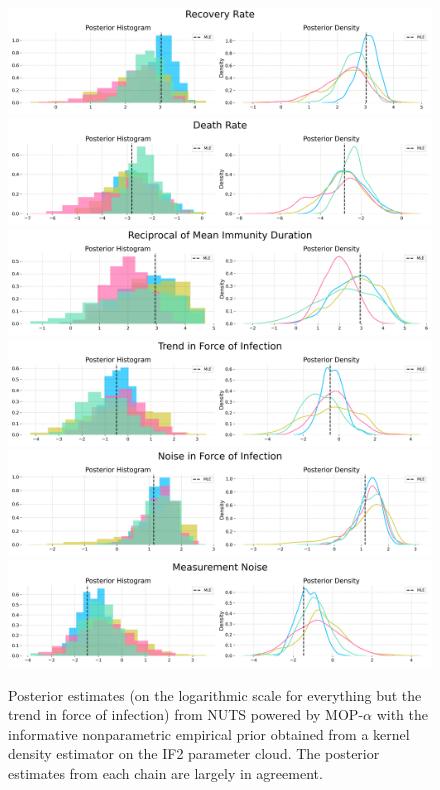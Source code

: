 \begin{figure}[H]
    \centering
    \includegraphics[scale=0.33]{imgs/pmcmc/nuts_eb/Recovery_Rate.png}
    \includegraphics[scale=0.33]{imgs/pmcmc/nuts_eb/Death_Rate.png}
    \includegraphics[scale=0.33]{imgs/pmcmc/nuts_eb/Reciprocal_of_Mean_Immunity_Duration.png}
    \includegraphics[scale=0.33]{imgs/pmcmc/nuts_eb/Trend_in_Force_of_Infection.png}
    \includegraphics[scale=0.33]{imgs/pmcmc/nuts_eb/Noise_in_Force_of_Infection.png}
    \includegraphics[scale=0.33]{imgs/pmcmc/nuts_eb/Measurement_Noise.png}
    \caption{Posterior estimates (on the logarithmic scale for everything but the trend in force of infection) from NUTS powered by MOP-$\alpha$ with the informative nonparametric empirical prior obtained from a kernel density estimator on the IF2 parameter cloud. The posterior estimates from each chain are largely in agreement.}
    \label{fig:posteriors}
\end{figure}

\FloatBarrier
\newpage